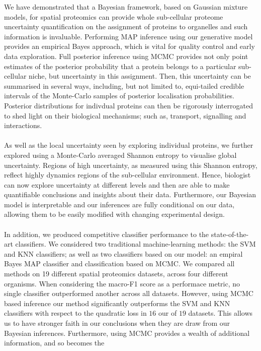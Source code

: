 \documentclass[12pt,english]{article}
\begin{document}
We have demonstrated that a Bayesian framework, based on Gaussian
mixture models, for spatial proteomics can provide whole sub-cellular
proteome uncertainty quantification on the assignment of proteins to
organelles and such information is invaluable. Performing MAP
inference using our generative model provides an empirical Bayes
approach, which is vital for quality control and early data
exploration. Full posterior inference using MCMC provides not only
point estimates of the posterior probability that a protein belongs to
a particular sub-cellular niche, but uncertainty in this
assignment. Then, this uncertainty can be summarised in several ways,
including, but not limited to, equi-tailed credible intervals of the
Monte-Carlo samples of posterior localisation probabilities.
Posterior distributions for indivdual proteins can then be rigorously
interrogated to shed light on their biological mechanisms; such as,
transport, signalling and interactions.
\\
\\
As well as the local uncertainty seen by exploring individual
proteins, we further explored using a Monte-Carlo averaged Shannon
entropy to visualise global uncertainty. Regions of high uncertainty,
as measured using this Shannon entropy, reflect highly dynamics
regions of the sub-cellular environment.  Hence, biologist can now
explore uncertainty at different levels and then are able to make
quantifiable conclusions and insights about their data.  Furthermore,
our Bayesian model is interpretable and our inferences are fully
conditional on our data, allowing them to be easily modified with
changing experimental design.
\\
\\
In addition, we produced competitive classifier performance to the
state-of-the-art classifiers. We considered two traditional
machine-learning methods: the SVM and KNN classifiers; as well as two
classifiers based on our model: an empiral Bayes MAP classifier and
classification based on MCMC. We compared all methods on 19 different
spatial proteomics datasets, across four different organisms. When
considering the macro-F1 score as a performace metric, no single
classifier outperformed another across all datasets. However, using
MCMC based inference our method significantly outperforms the SVM and
KNN classifiers with respect to the quadratic loss in $16$ our of $19$
datasets. This allows us to have stronger faith in our conclusions
when they are draw from our Bayesian inferences. Furthermore, using
MCMC provides a wealth of additional information, and so becomes the
\end{document}

